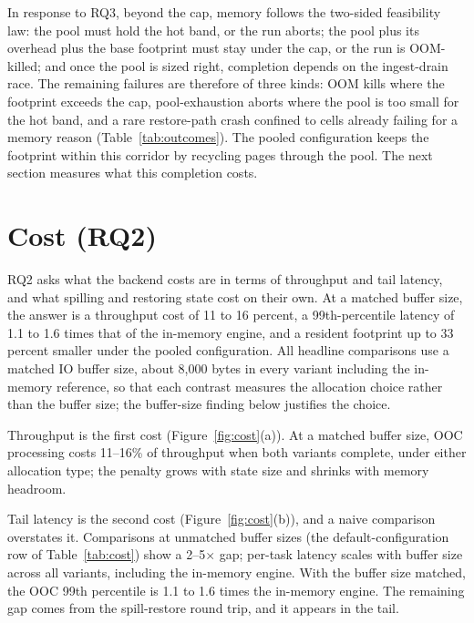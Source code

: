 In response to RQ3, beyond the cap, memory follows the two-sided feasibility law: the pool must hold the hot band, or the run aborts; the pool plus its overhead plus the base footprint must stay under the cap, or the run is OOM-killed; and once the pool is sized right, completion depends on the ingest-drain race.
The remaining failures are therefore of three kinds: OOM kills where the footprint exceeds the cap, pool-exhaustion aborts where the pool is too small for the hot band, and a rare restore-path crash confined to cells already failing for a memory reason (Table~\ref{tab:outcomes}).
The pooled configuration keeps the footprint within this corridor by recycling pages through the pool.
The next section measures what this completion costs.

\section{Cost (RQ2)\label{sec:rq2}}

RQ2 asks what the backend costs are in terms of throughput and tail latency, and what spilling and restoring state cost on their own.
At a matched buffer size, the answer is a throughput cost of 11 to 16 percent, a 99th-percentile latency of 1.1 to 1.6 times that of the in-memory engine, and a resident footprint up to 33 percent smaller under the pooled configuration.
All headline comparisons use a matched \ac{IO} buffer size, about 8{,}000 bytes in every variant including the in-memory reference, so that each contrast measures the allocation choice rather than the buffer size; the buffer-size finding below justifies the choice.

Throughput is the first cost (Figure~\ref{fig:cost}(a)).
At a matched buffer size, \ac{OOC} processing costs 11--16\% of throughput when both variants complete, under either allocation type; the penalty grows with state size and shrinks with memory headroom.

Tail latency is the second cost (Figure~\ref{fig:cost}(b)), and a naive comparison overstates it.
Comparisons at unmatched buffer sizes (the default-configuration row of Table~\ref{tab:cost}) show a 2--5$\times$ gap; per-task latency scales with buffer size across all variants, including the in-memory engine.
With the buffer size matched, the \ac{OOC} 99th percentile is 1.1 to 1.6 times the in-memory engine.
The remaining gap comes from the spill-restore round trip, and it appears in the tail.

